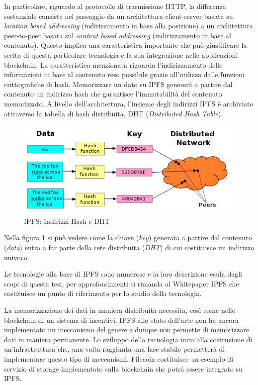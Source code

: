 In particolare, riguardo al protocollo di trasmissione HTTP, la differenza sostanziale consiste nel passaggio da un architettura client-server basata su \emph{location based addressing} (indirizzamento in base alla posizione) a un architettura peer-to-peer basata sul \emph{content based addressing} (indirizzamento in base al contenuto). Questo implica una caratteristica importante che può giustificare la scelta di questa particolare tecnologia e la sua integrazione nelle applicazioni blockchain. La caratteristica menzionata riguarda l'indirizzamento delle informazioni in base al contenuto reso possibile grazie all'utilizzo dalle funzioni crittografiche di hash. Memorizzare un dato su IPFS genererà a partire dal contenuto un indirizzo hash che garantisce l'immutabilità del contenuto memorizzato. A livello dell'architettura, l'insieme degli indirizzi IPFS è archiviato attraverso la tabella di hash distribuita, DHT (\emph{Distributed Hash Table}). 

\begin{figure}[H]
\centering
\includegraphics[width=1\textwidth]{immagini/ipfsDHT.PNG}
\caption{IPFS: Indirizzi Hash e DHT}
\label{fig:ipfsDHT}
\end{figure}

Nella figura \ref{fig:ipfsDHT} si può vedere come la chiave (\emph{key}) generata a partire dal contenuto (\emph{data}) entra a far parte della rete distribuita (\emph{DHT}) di cui costituisce un indirizzo univoco. 

Le tecnologie alla base di IPFS sono numerose e la loro descrizione esula dagli scopi di questa tesi, per approfondimenti si rimanda al Whitepaper IPFS che costituisce un punto di riferimento per lo studio della tecnologia. 

La memorizzazione dei dati in maniera distribuita necessita, così come nelle blockchain di un sistema di incentivi. IPFS allo stato dell'arte non ha ancora implementato un meccanismo del genere e dunque non permette di memorizzare dati in maniera permanente. Lo sviluppo della tecnologia mira alla costruzione di un'infrastruttura che, una volta raggiunta una fase stabile permetterà di implementare questo tipo di meccanismi. Filecoin costituisce un esempio di servizio di storage implementato sulla blockchain che potrà essere integrato su IPFS.